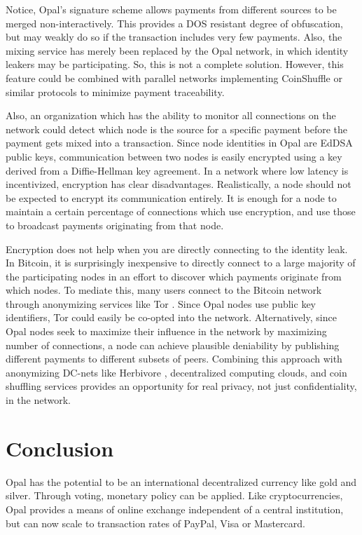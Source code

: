 \documentclass[10pt,twocolumn]{article}
\begin{document}
Notice, Opal's signature scheme allows payments from different sources to be merged non-interactively.  This provides a DOS resistant degree of obfuscation, but may weakly do so if the transaction includes very few payments.  Also, the mixing service has merely been replaced by the Opal network, in which identity leakers may be participating.  So, this is not a complete solution.  However, this feature could be combined with parallel networks implementing CoinShuffle \cite{ruff14} or similar protocols to minimize payment traceability.

Also, an organization which has the ability to monitor all connections on the network could detect which node is the source for a specific payment before the payment gets mixed into a transaction.  Since node identities in Opal are EdDSA public keys, communication between two nodes is easily encrypted using a key derived from a Diffie-Hellman key agreement.  In a network where low latency is incentivized, encryption has clear disadvantages.  Realistically, a node should not be expected to encrypt its communication entirely.  It is enough for a node to maintain a certain percentage of connections which use encryption, and use those to broadcast payments originating from that node.

Encryption does not help when you are directly connecting to the identity leak.  In Bitcoin, it is surprisingly inexpensive to directly connect to a large majority of the participating nodes in an effort to discover which payments originate from which nodes.  To mediate this, many users connect to the Bitcoin network through anonymizing services like Tor \cite{dingledine04}.  Since Opal nodes use public key identifiers, Tor could easily be co-opted into the network.  Alternatively, since Opal nodes seek to maximize their influence in the network by maximizing number of connections, a node can achieve plausible deniability by publishing different payments to different subsets of peers.  Combining this approach with anonymizing DC-nets like Herbivore \cite{goel03}, decentralized computing clouds, and coin shuffling services provides an opportunity for real privacy, not just confidentiality, in the network.

\section{Conclusion}
Opal has the potential to be an international decentralized currency like gold and silver.  Through voting, monetary policy can be applied.  Like cryptocurrencies, Opal provides a means of online exchange independent of a central institution, but can now scale to transaction rates of PayPal, Visa or Mastercard.
\end{document}
